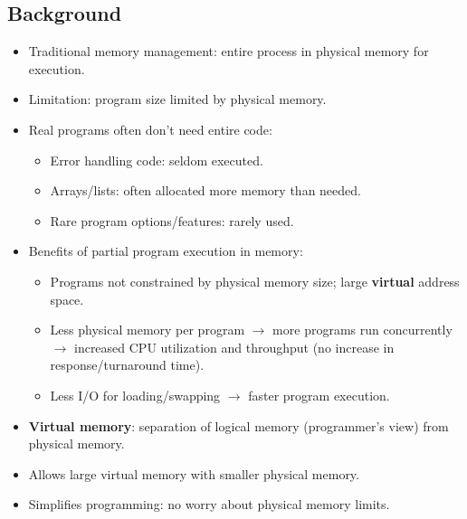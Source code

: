 \subsection{Background}
\begin{itemize}
    \item Traditional memory management: entire process in physical memory for execution.
    \item Limitation: program size limited by physical memory.
    \item Real programs often don't need entire code:
    \begin{itemize}
        \item Error handling code: seldom executed.
        \item Arrays/lists: often allocated more memory than needed.
        \item Rare program options/features: rarely used.
    \end{itemize}
    \item Benefits of partial program execution in memory:
    \begin{itemize}
        \item Programs not constrained by physical memory size; large \textbf{virtual} address space.
        \item Less physical memory per program $\rightarrow$ more programs run concurrently $\rightarrow$ increased CPU utilization and throughput (no increase in response/turnaround time).
        \item Less I/O for loading/swapping $\rightarrow$ faster program execution.
    \end{itemize}
    \item \textbf{Virtual memory}: separation of logical memory (programmer's view) from physical memory.
    \item Allows large virtual memory with smaller physical memory.
    \item Simplifies programming: no worry about physical memory limits.
\end{itemize}

